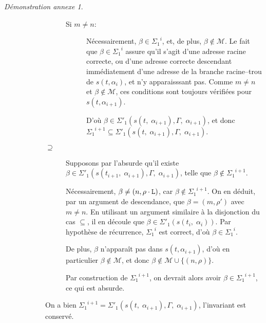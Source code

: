 \documentclass[11pt,a4paper]{article}
\theoremstyle{plain}
\theoremstyle{definition}
\theoremstyle{remark}
\newtheorem{demonstrationappendix}{Démonstration annexe}
\newcommand*{\someadd}{\rho}
\newcommand*{\sequent}{\Gamma}
\newcommand*{\Left}{\textnormal{\texttt{L}}}
\newcommand*{\highapprox}{\ensuremath{\Sigma_1}}
\newcommand*{\highapproxspec}{\ensuremath{\Sigma'_1}}
\newcommand*{\treesimplify}{\ensuremath{s}}
\begin{document}
\begin{demonstrationappendix}
\begin{description}
\begin{description}
\begin{description}
\begin{description}
                        \item[Si $m \neq n$:] 
                            Nécessairement, $\beta \in {\highapprox}^{i}$, et, de plus, $\beta \notin \mathcal{M}$. Le fait que $\beta \in {\highapprox}^{i}$ assure qu'il s'agit d'une adresse racine correcte, ou d'une adresse correcte descendant immédiatement d'une adresse de la branche racine--trou de $s(t, \alpha_{i})$, et n'y apparaisssant pas. Comme $m \neq n$ et $\beta \notin \mathcal{M}$, ces conditions sont toujours vérifiées pour $s(t, \alpha_{i+1})$.
                        
                        D'où $\beta \in \highapproxspec \left( \treesimplify( t, \; {\alpha}_{i+1} ), \sequent, \; {\alpha}_{i+1} \right)$, et donc ${\highapprox}^{i+1} \subseteq \highapproxspec \left( \treesimplify( t, \; {\alpha}_{i+1} ), \sequent, \; {\alpha}_{i+1} \right)$.
                    \end{description}

                \item[$\supseteq$]
                    Supposons par l'absurde qu'il existe $\beta \in \highapproxspec \left( \treesimplify( t_{i+1}, \; {\alpha}_{i+1} ), \sequent, \; {\alpha}_{i+1} \right)$, telle que $\beta \notin {\highapprox}^{i+1}$. 
                    
                    Nécessairement, $\beta \neq (n, \someadd \cdot \Left)$, car $\beta \notin {\highapprox}^{i+1}$. On en déduit, par un argument de descendance, que $\beta = (m, \someadd')$ avec $m \neq n$. En utilisant un argument similaire à la disjonction du cas $\subseteq$, il en découle que $\beta \in \highapproxspec \left( \treesimplify( t_{i}, \; {\alpha}_{i} ) \right)$. Par hypothèse de récurrence, ${\highapprox}^{i}$ est correct, d'où $\beta \in {\highapprox}^{i}$.
                    
                    De plus, $\beta$ n'apparaît pas dans $s(t, \alpha_{i+1})$, d'où en particulier $\beta \notin \mathcal{M}$, et donc $\beta \notin \mathcal{M} \cup \{ (n, \someadd) \}$.

                    Par construction de ${\highapprox}^{i+1}$, on devrait alors avoir $\beta \in {\highapprox}^{i+1}$, ce qui est absurde.
            \end{description}

            On a bien ${\highapprox}^{i+1} = \highapproxspec \left( \treesimplify( t, \; {\alpha}_{i+1} ), \sequent, \; {\alpha}_{i+1} \right)$, l'invariant est conservé.
    

\end{description}
\end{description}
\end{demonstrationappendix}
\end{document}

